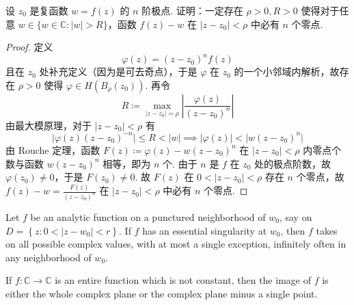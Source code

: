\begin{exercise}
设 $z_0$ 是复函数 $w=f(z)$ 的 $n$ 阶极点. 证明：一定存在 $\rho>0,R>0$ 使得对于任意 $w\in \{ w\in \mathbb{C}:\lvert w \rvert>R \}$，函数 $f(z)-w$ 在 $\lvert z-z_0 \rvert<\rho$ 中必有 $n$ 个零点.
\end{exercise}
\begin{proof}
定义
\[
\varphi(z)=(z-z_0)^{n}f(z)
\]
且在 $z_0$ 处补充定义（因为是可去奇点），于是 $\varphi$ 在 $z_0$ 的一个小邻域内解析，故存在 $\rho>0$ 使得 $\varphi\in H(B_{\rho}(z_0))$. 再令
\[
R\coloneqq \max_{\lvert z-z_0 \rvert =\rho}\left\lvert  \frac{\varphi(z)}{(z-z_0)^{n}}  \right\rvert
\]
由最大模原理，对于 $\lvert z-z_0 \rvert<\rho$ 有
\[
\lvert \varphi(z)(z-z_0)^{-n} \rvert\leq R<\lvert w \rvert  \implies \lvert \varphi (z) \rvert< \lvert w(z-z_0)^{n} \rvert
\]
由 Rouche 定理，函数 $F(z)\coloneqq\varphi(z)-w(z-z_0)^{n}$ 在 $\lvert z-z_0 \rvert <\rho$ 内零点个数与函数 $w(z-z_0)^{n}$ 相等，即为 $n$ 个. 由于 $n$ 是 $f$ 在 $z_0$ 处的极点阶数，故 $\varphi(z_0)\neq0$，于是 $F(z_0)\neq0$. 故 $F(z)$ 在 $0<\lvert z-z_0 \rvert<\rho$ 存在 $n$ 个零点，故 $f(z)-w=\frac{F(z)}{(z-z_0)^{n}}$ 在 $\lvert z-z_0 \rvert <\rho$ 中必有 $n$ 个零点.
\end{proof}

\begin{theorem}
Let $f$ be an analytic function on a punctured neighborhood of $w_{0}$, say on $D=\left\{z: 0<\left|z-w_{0}\right|<r\right\}$.
If $f$ has an essential singularity at $w_{0}$, then $f$ takes on all possible complex values, with at most a single exception, infinitely often in any neighborhood of $w_{0}$.
\end{theorem}
\begin{theorem}
If $f : \mathbb{C} \to \mathbb{C}$ is an entire function which is not constant, then the image of $f$ is either the whole complex plane or the complex plane minus a single point.
\end{theorem}